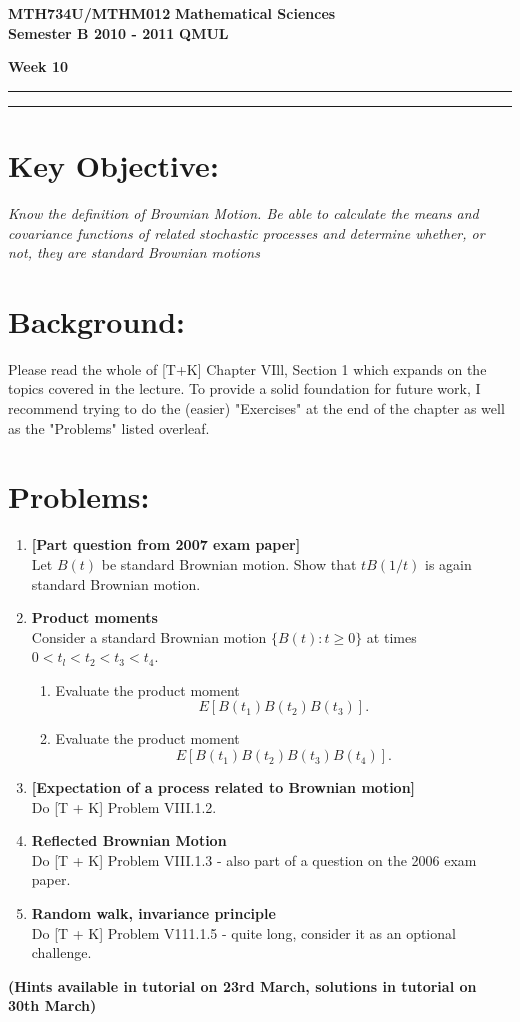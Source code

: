 \documentclass[11pt,a4paper]{article}
\begin{document}
  \textbf{MTH734U/MTHM012} \hfill \textbf{Mathematical Sciences}\\
  \textbf{Semester B 2010 - 2011} \hfill \textbf{QMUL}
  \begin{center}
    \textbf{\huge Week 10}
  \end{center}
  \hrule \vspace{2mm} \hrule

  \section*{Key Objective:}
  \textit{Know the definition of Brownian Motion. Be able to calculate the means and covariance functions of related stochastic processes and determine whether, or not, they are standard Brownian motions}

  \section*{Background:}
  Please read the whole of [T+K] Chapter VIll, Section 1 which expands on the topics covered in the lecture. To provide a solid foundation for future work, I recommend trying to do the (easier) "Exercises" at the end of the chapter as well as the "Problems" listed overleaf.
  \newpage

  \section*{Problems:}
  \begin{enumerate}
    \item \textbf{[Part question from 2007 exam paper]}\\
    Let $B(t)$ be standard Brownian motion. Show that $tB(1/t)$ is again standard Brownian motion.
    \item \textbf{Product moments}\\
    Consider a standard Brownian motion $\{B(t): t \geq 0\}$ at times $0 < t_l < t_2 < t_3 < t_4$.
    \begin{enumerate}
      \item Evaluate the product moment
      $$
      E[B(t_1)B(t_2)B(t_3)].
      $$
      \item Evaluate the product moment
      $$
      E[B(t_1)B(t_2)B(t_3)B(t_4)].
      $$
    \end{enumerate}
    \item \textbf{[Expectation of a process related to Brownian motion]}\\
    Do [T + K] Problem VIII.1.2.
    \item \textbf{Reflected Brownian Motion}\\
    Do [T + K] Problem VIII.1.3 - also part of a question on the 2006 exam paper.
    \item \textbf{Random walk, invariance principle}\\
    Do [T + K] Problem V111.1.5 - quite long, consider it as an optional challenge.
  \end{enumerate}
  \textbf{(Hints available in tutorial on 23rd March, solutions in tutorial on 30th March)}
  \newpage
\end{document}
